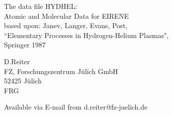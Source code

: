 \documentclass[12pt,dvipdfm]{article}
\begin{document}
\parindent 0pt
{\LARGE \bf \center
\vspace*{3truecm}

The data file HYDHEL: \\
Atomic and Molecular Data for EIRENE \\
based upon: Janev, Langer, Evans, Post, \\
``Elementary
Processes in Hydrogen-Helium Plasmas", \\
Springer 1987
\vspace*{3truecm}

D.Reiter \\
FZ, Forschungszentrum J\"ulich GmbH \\
52425 J\"ulich \\
FRG
\vspace{5truecm}


Available via E-mail from d.reiter@fz-juelich.de
}

\newpage
{}
\tableofcontents
\newpage
\end{document}
